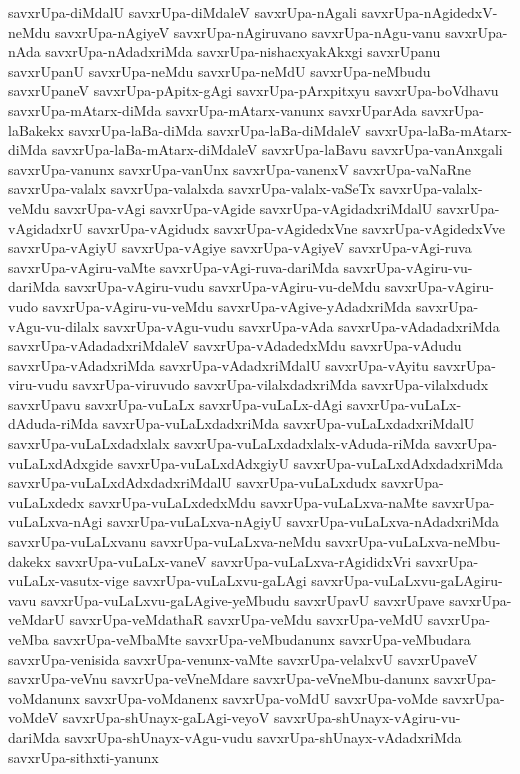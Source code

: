 {savxrUpa-diMdalU
savxrUpa-diMdaleV
savxrUpa-nAgali
savxrUpa-nAgidedxV-neMdu
savxrUpa-nAgiyeV
savxrUpa-nAgiruvano
savxrUpa-nAgu-vanu
savxrUpa-nAda
savxrUpa-nAdadxriMda
savxrUpa-nishacxyakAkxgi
savxrUpanu
savxrUpanU
savxrUpa-neMdu
savxrUpa-neMdU
savxrUpa-neMbudu
savxrUpaneV
savxrUpa-pApitx-gAgi
savxrUpa-pArxpitxyu
savxrUpa-boVdhavu
savxrUpa-mAtarx-diMda
savxrUpa-mAtarx-vanunx
savxrUparAda
savxrUpa-laBakekx
savxrUpa-laBa-diMda
savxrUpa-laBa-diMdaleV
savxrUpa-laBa-mAtarx-diMda
savxrUpa-laBa-mAtarx-diMdaleV
savxrUpa-laBavu
savxrUpa-vanAnxgali
savxrUpa-vanunx
savxrUpa-vanUnx
savxrUpa-vanenxV
savxrUpa-vaNaRne
savxrUpa-valalx
savxrUpa-valalxda
savxrUpa-valalx-vaSeTx
savxrUpa-valalx-veMdu
savxrUpa-vAgi
savxrUpa-vAgide
savxrUpa-vAgidadxriMdalU
savxrUpa-vAgidadxrU
savxrUpa-vAgidudx
savxrUpa-vAgidedxVne
savxrUpa-vAgidedxVve
savxrUpa-vAgiyU
savxrUpa-vAgiye
savxrUpa-vAgiyeV
savxrUpa-vAgi-ruva
savxrUpa-vAgiru-vaMte
savxrUpa-vAgi-ruva-dariMda
savxrUpa-vAgiru-vu-dariMda
savxrUpa-vAgiru-vudu
savxrUpa-vAgiru-vu-deMdu
savxrUpa-vAgiru-vudo
savxrUpa-vAgiru-vu-veMdu
savxrUpa-vAgive-yAdadxriMda
savxrUpa-vAgu-vu-dilalx
savxrUpa-vAgu-vudu
savxrUpa-vAda
savxrUpa-vAdadadxriMda
savxrUpa-vAdadadxriMdaleV
savxrUpa-vAdadedxMdu
savxrUpa-vAdudu
savxrUpa-vAdadxriMda
savxrUpa-vAdadxriMdalU
savxrUpa-vAyitu
savxrUpa-viru-vudu
savxrUpa-viruvudo
savxrUpa-vilalxdadxriMda
savxrUpa-vilalxdudx
savxrUpavu
savxrUpa-vuLaLx
savxrUpa-vuLaLx-dAgi
savxrUpa-vuLaLx-dAduda-riMda
savxrUpa-vuLaLxdadxriMda
savxrUpa-vuLaLxdadxriMdalU
savxrUpa-vuLaLxdadxlalx
savxrUpa-vuLaLxdadxlalx-vAduda-riMda
savxrUpa-vuLaLxdAdxgide
savxrUpa-vuLaLxdAdxgiyU
savxrUpa-vuLaLxdAdxdadxriMda
savxrUpa-vuLaLxdAdxdadxriMdalU
savxrUpa-vuLaLxdudx
savxrUpa-vuLaLxdedx
savxrUpa-vuLaLxdedxMdu
savxrUpa-vuLaLxva-naMte
savxrUpa-vuLaLxva-nAgi
savxrUpa-vuLaLxva-nAgiyU
savxrUpa-vuLaLxva-nAdadxriMda
savxrUpa-vuLaLxvanu
savxrUpa-vuLaLxva-neMdu
savxrUpa-vuLaLxva-neMbu-dakekx
savxrUpa-vuLaLx-vaneV
savxrUpa-vuLaLxva-rAgididxVri
savxrUpa-vuLaLx-vasutx-vige
savxrUpa-vuLaLxvu-gaLAgi
savxrUpa-vuLaLxvu-gaLAgiru-vavu
savxrUpa-vuLaLxvu-gaLAgive-yeMbudu
savxrUpavU
savxrUpave
savxrUpa-veMdarU
savxrUpa-veMdathaR
savxrUpa-veMdu
savxrUpa-veMdU
savxrUpa-veMba
savxrUpa-veMbaMte
savxrUpa-veMbudanunx
savxrUpa-veMbudara
savxrUpa-venisida
savxrUpa-venunx-vaMte
savxrUpa-velalxvU
savxrUpaveV
savxrUpa-veVnu
savxrUpa-veVneMdare
savxrUpa-veVneMbu-danunx
savxrUpa-voMdanunx
savxrUpa-voMdanenx
savxrUpa-voMdU
savxrUpa-voMde
savxrUpa-voMdeV
savxrUpa-shUnayx-gaLAgi-veyoV
savxrUpa-shUnayx-vAgiru-vu-dariMda
savxrUpa-shUnayx-vAgu-vudu
savxrUpa-shUnayx-vAdadxriMda
savxrUpa-sithxti-yanunx
}
